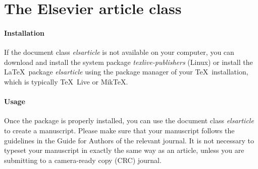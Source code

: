 \documentclass[review]{elsarticle}
\begin{document}
\begin{frontmatter}

\title{\TITLE{}}

\author{Elsevier}
\address{Radarweg 29, Amsterdam}

\author[mymainaddress,mysecondaryaddress]{Elsevier Inc}

\author[mysecondaryaddress]{Global Customer Service}

\address[mymainaddress]{1600 John F Kennedy Boulevard, Philadelphia}
\address[mysecondaryaddress]{360 Park Avenue South, New York}

\begin{abstract}
\end{abstract}

\begin{keyword}
\KEYWORDS
\end{keyword}

\end{frontmatter}

\linenumbers

\section{The Elsevier article class}

\paragraph{Installation} If the document class \emph{elsarticle} is not available on your computer, you can download and install the system package \emph{texlive-publishers} (Linux) or install the \LaTeX\ package \emph{elsarticle} using the package manager of your \TeX\ installation, which is typically \TeX\ Live or Mik\TeX.

\paragraph{Usage} Once the package is properly installed, you can use the document class \emph{elsarticle} to create a manuscript. Please make sure that your manuscript follows the guidelines in the Guide for Authors of the relevant journal. It is not necessary to typeset your manuscript in exactly the same way as an article, unless you are submitting to a camera-ready copy (CRC) journal.
\end{document}

